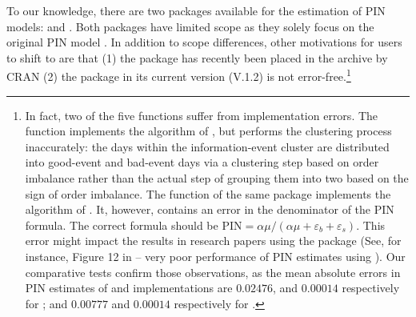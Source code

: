 To our knowledge, there are two packages available for the estimation of PIN models:  \citep{Recktenwald2018pinbasic,recktenwald2019advanced} and  \citep{Celik2017InfoTrad,Celik2018InfoTrad}. Both packages have limited scope as they solely focus on the original PIN model \citep{easley1996liquidity}. In addition to scope differences, other motivations for users to shift to  are that (1) the package  has recently been placed in the archive by CRAN (2) the package  in its current version (V.1.2) is not error-free.\footnote{In fact, two of the five functions suffer from implementation errors. The function  implements the algorithm of \cite{Ersan2016unbiased}, but performs the clustering process inaccurately: the days within the information-event cluster are distributed into good-event and bad-event days via a clustering step based on order imbalance rather than the actual step of grouping them into two based on the sign of order imbalance. The function  of the same package implements the algorithm of \cite{Yan2012improved}. It, however, contains an error in the denominator of the PIN formula. The correct formula should be $\mathrm{PIN} =\alpha \mu /(\alpha \mu +\varepsilon_{b}+\varepsilon_{s})$. This error might impact the results in research papers using the package (See, for instance, Figure 12 in \cite{griffin2021} – very poor performance of PIN estimates using ). Our comparative tests confirm those observations, as the mean absolute errors in PIN estimates of  and  implementations are $0.02476$, and $0.00014$ respectively for \cite{Yan2012improved}; and $0.00777$  and $0.00014$ respectively for \cite{Ersan2016unbiased}.}

